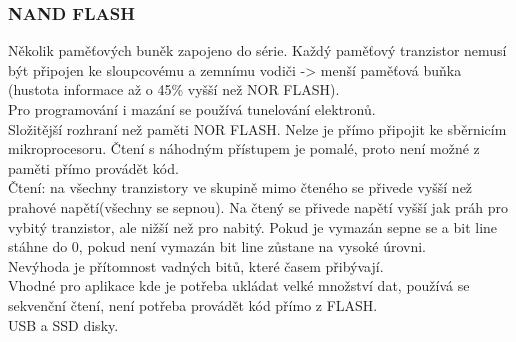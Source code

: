 \subsubsection*{NAND FLASH}
Několik paměťových buněk zapojeno do série. Každý paměťový tranzistor nemusí být připojen ke sloupcovému
a zemnímu vodiči -> menší paměťová buňka (hustota informace
až o 45\% vyšší než NOR FLASH).\\
Pro programování i mazání se používá tunelování elektronů.\\
Složitější rozhraní než paměti NOR FLASH. Nelze je přímo připojit ke sběrnicím mikroprocesoru. Čtení s náhodným přístupem je pomalé, proto není možné z paměti přímo provádět kód. \\
Čtení: na všechny tranzistory ve skupině mimo čteného se přivede vyšší než prahové napětí(všechny se sepnou). Na čtený se přivede napětí vyšší jak práh pro vybitý tranzistor, ale nižší než pro nabitý. Pokud je vymazán sepne se a bit line stáhne do 0, pokud není vymazán bit line zůstane na vysoké úrovni. \\
Nevýhoda je přítomnost vadných bitů, které časem přibývají.\\
Vhodné pro aplikace kde je potřeba ukládat velké množství dat, používá se sekvenční čtení, není potřeba provádět kód přímo z FLASH.\\
USB a SSD disky.\\

